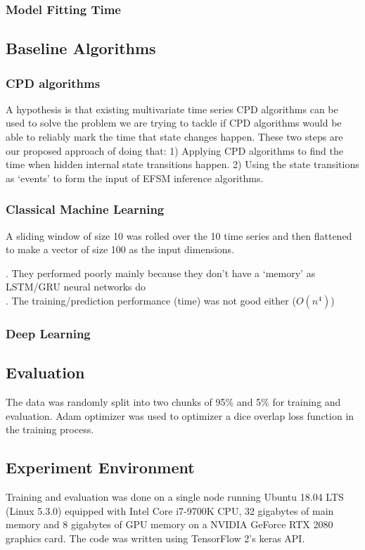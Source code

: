 \subsubsection{Model Fitting Time}


\subsection{Baseline Algorithms}
\subsubsection{CPD algorithms}
A hypothesis is that existing multivariate time series CPD algorithms can be used to solve the problem we are trying to tackle if CPD algorithms would be able to reliably mark the time that state changes happen.
These two steps are our proposed approach of doing that:
1) Applying CPD algorithms to find the time when hidden internal state transitions happen. 
2) Using the state transitions as `events' to form the input of EFSM inference algorithms.

\subsubsection{Classical Machine Learning}
A sliding window of size 10 was rolled over the 10 time series and then flattened to make a vector of size 100 as the input dimensions.


. They performed poorly mainly because they don't have a `memory' as LSTM/GRU neural networks do\\
. The training/prediction performance (time) was not good either ($O(n^4)$)\\


\subsubsection{Deep Learning}

\subsection{Evaluation}


The data was randomly split into two chunks of 95\% and 5\% for training and evaluation.
Adam optimizer \cite{kingma2014adam} was used to optimizer a dice overlap loss function \cite{milletari2016v} in the training process.


\subsection{Experiment Environment}
Training and evaluation was done on a single node running Ubuntu 18.04 LTS (Linux 5.3.0) equipped with Intel Core i7-9700K CPU, 32 gigabytes of main memory and 8 gigabytes of GPU memory on a NVIDIA GeForce RTX 2080 graphics card.
The code was written using TensorFlow 2's keras API.



